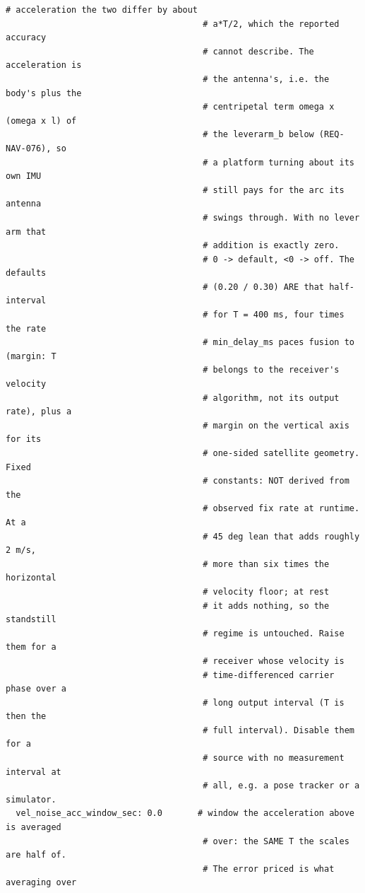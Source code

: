\documentclass[11pt,a4paper]{article}
\begin{document}
\begin{lstlisting}[style=cfg]
                                       # acceleration the two differ by about
                                       # a*T/2, which the reported accuracy
                                       # cannot describe. The acceleration is
                                       # the antenna's, i.e. the body's plus the
                                       # centripetal term omega x (omega x l) of
                                       # the leverarm_b below (REQ-NAV-076), so
                                       # a platform turning about its own IMU
                                       # still pays for the arc its antenna
                                       # swings through. With no lever arm that
                                       # addition is exactly zero.
                                       # 0 -> default, <0 -> off. The defaults
                                       # (0.20 / 0.30) ARE that half-interval
                                       # for T = 400 ms, four times the rate
                                       # min_delay_ms paces fusion to (margin: T
                                       # belongs to the receiver's velocity
                                       # algorithm, not its output rate), plus a
                                       # margin on the vertical axis for its
                                       # one-sided satellite geometry. Fixed
                                       # constants: NOT derived from the
                                       # observed fix rate at runtime. At a
                                       # 45 deg lean that adds roughly 2 m/s,
                                       # more than six times the horizontal
                                       # velocity floor; at rest
                                       # it adds nothing, so the standstill
                                       # regime is untouched. Raise them for a
                                       # receiver whose velocity is
                                       # time-differenced carrier phase over a
                                       # long output interval (T is then the
                                       # full interval). Disable them for a
                                       # source with no measurement interval at
                                       # all, e.g. a pose tracker or a simulator.
  vel_noise_acc_window_sec: 0.0       # window the acceleration above is averaged
                                       # over: the SAME T the scales are half of.
                                       # The error priced is what averaging over

\end{lstlisting}
\end{document}
